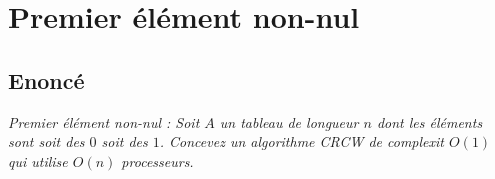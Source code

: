 \section{Premier élément non-nul}
\subsection{Enoncé}
\textit{Premier élément non-nul : Soit $A$ un tableau de longueur $n$ dont les éléments sont soit des $0$ soit des $1$. Concevez un algorithme CRCW de complexit $O(1)$ qui utilise $O(n)$ processeurs.}
